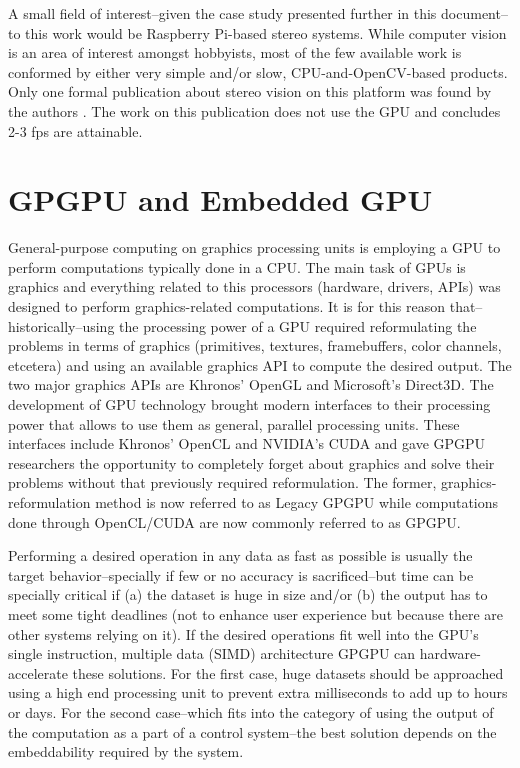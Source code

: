 \documentclass[conference]{IEEEtran}
\begin{document}
A small field of interest--given the case study presented further in this document--to this work would be Raspberry Pi-based stereo systems. While computer vision is an area of interest amongst hobbyists, most of the few available work is conformed by either very simple and/or slow, CPU-and-OpenCV-based products. Only one formal publication about stereo vision on this platform was found by the authors \cite{neves13}. The work on this publication does not use the GPU and concludes 2-3 fps are attainable.


\section{GPGPU and Embedded GPU}
General-purpose computing on graphics processing units is employing a GPU to perform computations typically done in a CPU. The main task of GPUs is graphics and everything related to this processors (hardware, drivers, APIs) was designed to perform graphics-related computations. It is for this reason that--historically--using the processing power of a GPU required reformulating the problems in terms of graphics (primitives, textures, framebuffers, color channels, etcetera) and using an available graphics API to compute the desired output. The two major graphics APIs are Khronos' OpenGL and Microsoft's Direct3D. The development of GPU technology brought modern interfaces to their processing power that allows to use them as general, parallel processing units. These interfaces include Khronos' OpenCL and NVIDIA's CUDA and gave GPGPU researchers the opportunity to completely forget about graphics and solve their problems without that previously required reformulation. The former, graphics-reformulation method is now referred to as Legacy GPGPU while computations done through OpenCL/CUDA are now commonly referred to as GPGPU.

Performing a desired operation in any data as fast as possible is usually the target behavior--specially if few or no accuracy is sacrificed--but time can be specially critical if (a) the dataset is huge in size and/or (b) the output has to meet some tight deadlines (not to enhance user experience but because there are other systems relying on it). If the desired operations fit well into the GPU's single instruction, multiple data (SIMD) architecture GPGPU can hardware-accelerate these solutions. For the first case, huge datasets should be approached using a high end processing unit to prevent extra milliseconds to add up to hours or days. For the second case--which fits into the category of using the output of the computation as a part of a control system--the best solution depends on the embeddability required by the system.
\end{document}
